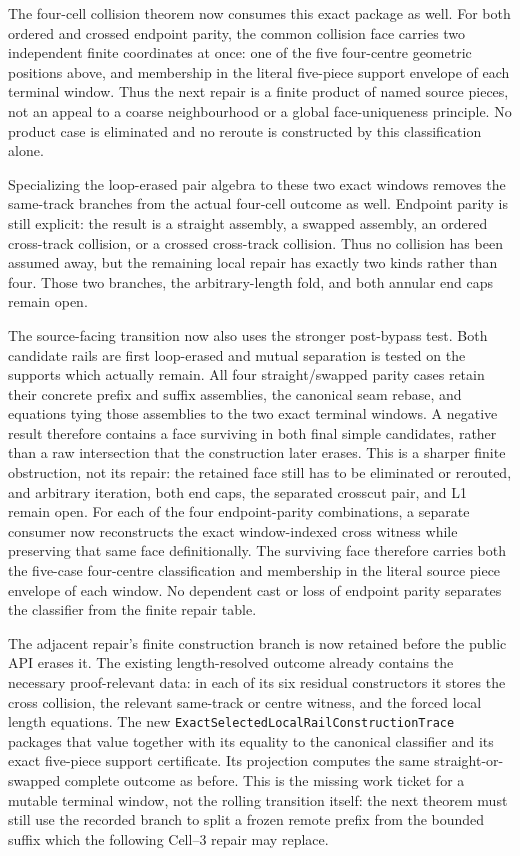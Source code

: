 \documentclass[11pt]{article}
\theoremstyle{definition}
\begin{document}
The four-cell collision theorem now consumes this exact package as well.  For
both ordered and crossed endpoint parity, the common collision face carries
two independent finite coordinates at once: one of the five four-centre
geometric positions above, and membership in the literal five-piece support
envelope of each terminal window.  Thus the next repair is a finite product
of named source pieces, not an appeal to a coarse neighbourhood or a global
face-uniqueness principle.  No product case is eliminated and no reroute is
constructed by this classification alone.

Specializing the loop-erased pair algebra to these two exact windows removes
the same-track branches from the actual four-cell outcome as well.  Endpoint
parity is still explicit: the result is a straight assembly, a swapped
assembly, an ordered cross-track collision, or a crossed cross-track
collision.  Thus no collision has been assumed away, but the remaining local
repair has exactly two kinds rather than four.  Those two branches, the
arbitrary-length fold, and both annular end caps remain open.

The source-facing transition now also uses the stronger post-bypass test.
Both candidate rails are first loop-erased and mutual separation is tested on
the supports which actually remain.  All four straight/swapped parity cases
retain their concrete prefix and suffix assemblies, the canonical seam
rebase, and equations tying those assemblies to the two exact terminal
windows.  A negative result therefore contains a face surviving in both final
simple candidates, rather than a raw intersection that the construction later
erases.  This is a sharper finite obstruction, not its repair: the retained
face still has to be eliminated or rerouted, and arbitrary iteration, both
end caps, the separated crosscut pair, and L1 remain open.
For each of the four endpoint-parity combinations, a separate consumer now
reconstructs the exact window-indexed cross witness while preserving that
same face definitionally.  The surviving face therefore carries both the
five-case four-centre classification and membership in the literal source
piece envelope of each window.  No dependent cast or loss of endpoint parity
separates the classifier from the finite repair table.

The adjacent repair's finite construction branch is now retained before the
public API erases it.  The existing length-resolved outcome already contains
the necessary proof-relevant data: in each of its six residual constructors it
stores the cross collision, the relevant same-track or centre witness, and the
forced local length equations.  The new
\texttt{ExactSelectedLocalRailConstructionTrace} packages that value together
with its equality to the canonical classifier and its exact five-piece support
certificate.  Its projection computes the same straight-or-swapped complete
outcome as before.  This is the missing work ticket for a mutable terminal
window, not the rolling transition itself: the next theorem must still use the
recorded branch to split a frozen remote prefix from the bounded suffix which
the following Cell--3 repair may replace.
\end{document}
